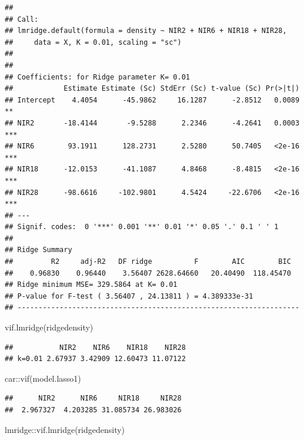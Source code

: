 \documentclass[
]{article}
\newenvironment{Shaded}{\begin{snugshade}}{\end{snugshade}}
\newcommand{\FunctionTok}[1]{\textcolor[rgb]{0.00,0.00,0.00}{#1}}
\newcommand{\NormalTok}[1]{#1}
\newcommand{\SpecialCharTok}[1]{\textcolor[rgb]{0.00,0.00,0.00}{#1}}
\begin{document}
\begin{verbatim}
## 
## Call:
## lmridge.default(formula = density ~ NIR2 + NIR6 + NIR18 + NIR28, 
##     data = X, K = 0.01, scaling = "sc")
## 
## 
## Coefficients: for Ridge parameter K= 0.01 
##            Estimate Estimate (Sc) StdErr (Sc) t-value (Sc) Pr(>|t|)    
## Intercept    4.4054      -45.9862     16.1287      -2.8512   0.0089 ** 
## NIR2       -18.4144       -9.5288      2.2346      -4.2641   0.0003 ***
## NIR6        93.1911      128.2731      2.5280      50.7405   <2e-16 ***
## NIR18      -12.0153      -41.1087      4.8468      -8.4815   <2e-16 ***
## NIR28      -98.6616     -102.9801      4.5424     -22.6706   <2e-16 ***
## ---
## Signif. codes:  0 '***' 0.001 '**' 0.01 '*' 0.05 '.' 0.1 ' ' 1
## 
## Ridge Summary
##         R2     adj-R2   DF ridge          F        AIC        BIC 
##    0.96830    0.96440    3.56407 2628.64660   20.40490  118.45470 
## Ridge minimum MSE= 329.5864 at K= 0.01 
## P-value for F-test ( 3.56407 , 24.13811 ) = 4.389333e-31 
## -------------------------------------------------------------------
\end{verbatim}

\begin{Shaded}
\begin{Highlighting}[]
\FunctionTok{vif.lmridge}\NormalTok{(ridgedensity)}
\end{Highlighting}
\end{Shaded}

\begin{verbatim}
##           NIR2    NIR6    NIR18    NIR28
## k=0.01 2.67937 3.42909 12.60473 11.07122
\end{verbatim}

\begin{Shaded}
\begin{Highlighting}[]
\NormalTok{car}\SpecialCharTok{::}\FunctionTok{vif}\NormalTok{(model.lasso1)}
\end{Highlighting}
\end{Shaded}

\begin{verbatim}
##      NIR2      NIR6     NIR18     NIR28 
##  2.967327  4.203285 31.085734 26.983026
\end{verbatim}

\begin{Shaded}
\begin{Highlighting}[]
\NormalTok{lmridge}\SpecialCharTok{::}\FunctionTok{vif.lmridge}\NormalTok{(ridgedensity)}
\end{Highlighting}
\end{Shaded}
\end{document}
